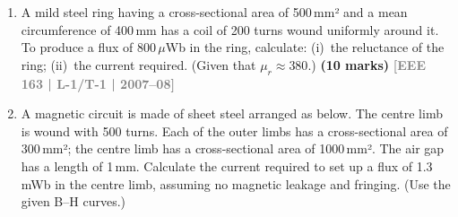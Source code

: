 \documentclass[12pt,a3paper]{article}
\newcommand{\yr}[1]{\hfill\textcolor{gray}{\small\textbf{[#1]}}}
\newcommand{\mk}[1]{\textcolor{orange!70!black}{\small\textbf{(#1 marks)}}}
\begin{document}
\begin{enumerate}
\item A mild steel ring having a cross-sectional area of 500\,mm² and a mean circumference of 400\,mm has a coil of 200 turns wound uniformly around it. To produce a flux of 800\,$\mu$Wb in the ring, calculate: (i)~the reluctance of the ring; (ii)~the current required. (Given that $\mu_r \approx 380$.)
\mk{10} \yr{EEE 163 | L-1/T-1 | 2007--08}

\item A magnetic circuit is made of sheet steel arranged as below. The centre limb is wound with 500 turns. Each of the outer limbs has a cross-sectional area of 300\,mm²; the centre limb has a cross-sectional area of 1000\,mm². The air gap has a length of 1\,mm. Calculate the current required to set up a flux of 1.3\,mWb in the centre limb, assuming no magnetic leakage and fringing. (Use the given B--H curves.)

\begin{center}
\end{center}
\end{enumerate}
\end{document}
